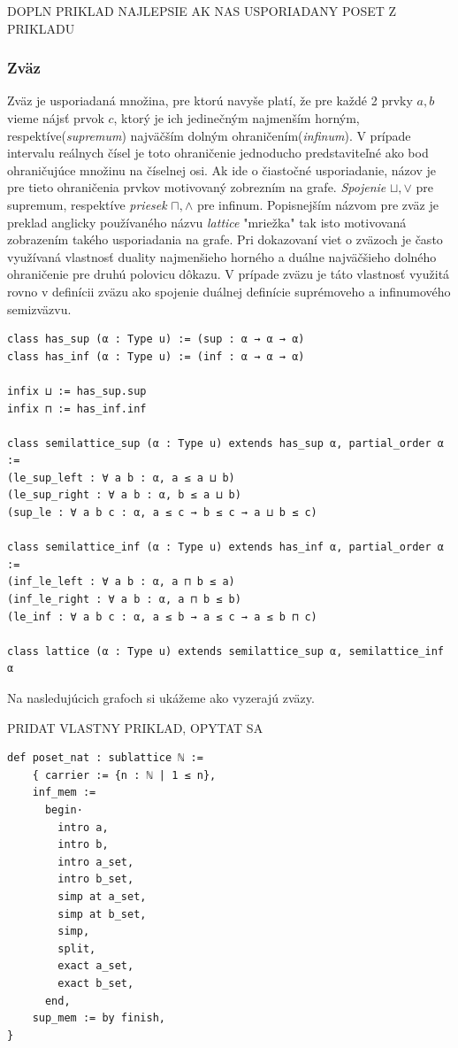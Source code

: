 \documentclass[a4paper,10pt,oneside]{report}%
\begin{document}
DOPLN PRIKLAD NAJLEPSIE AK NAS USPORIADANY POSET Z PRIKLADU

\subsubsection{Zväz}
    Zväz je usporiadaná množina, pre ktorú navyše platí, že pre každé 2 prvky $a, b$
vieme nájsť prvok $c$, ktorý je ich jedinečným najmenším horným, respektíve(\emph{supremum})
najväčším dolným ohraničením(\emph{infinum}).
    V prípade intervalu reálnych čísel je toto ohraničenie jednoducho predstaviteľné
ako bod ohraničujúce množinu na číselnej osi.
    Ak ide o čiastočné usporiadanie, názov je pre tieto ohraničenia prvkov
motivovaný zobrezním na grafe.
    \emph{Spojenie} $\sqcup, \vee$ pre supremum, respektíve \emph{priesek} $\sqcap, \wedge$ pre infinum.
    Popisnejším názvom pre zväz je preklad anglicky používaného názvu \emph{lattice}
"mriežka" tak isto motivovaná zobrazením takého usporiadania na grafe.
    Pri dokazovaní viet o zväzoch je často využívaná vlastnosť duality najmenšieho
horného a duálne najväčšieho dolného ohraničenie pre druhú polovicu dôkazu.
    V prípade zväzu je táto vlastnosť využitá rovno v definícii zväzu ako spojenie
duálnej definície suprémoveho a infinumového semizväzvu.

\begin{lstlisting}
class has_sup (α : Type u) := (sup : α → α → α)
class has_inf (α : Type u) := (inf : α → α → α)

infix ⊔ := has_sup.sup
infix ⊓ := has_inf.inf

class semilattice_sup (α : Type u) extends has_sup α, partial_order α :=
(le_sup_left : ∀ a b : α, a ≤ a ⊔ b)
(le_sup_right : ∀ a b : α, b ≤ a ⊔ b)
(sup_le : ∀ a b c : α, a ≤ c → b ≤ c → a ⊔ b ≤ c)

class semilattice_inf (α : Type u) extends has_inf α, partial_order α :=
(inf_le_left : ∀ a b : α, a ⊓ b ≤ a)
(inf_le_right : ∀ a b : α, a ⊓ b ≤ b)
(le_inf : ∀ a b c : α, a ≤ b → a ≤ c → a ≤ b ⊓ c)

class lattice (α : Type u) extends semilattice_sup α, semilattice_inf α
\end{lstlisting}

Na nasledujúcich grafoch si ukážeme ako vyzerajú zväzy.

PRIDAT VLASTNY PRIKLAD, OPYTAT SA
\begin{lstlisting}
def poset_nat : sublattice ℕ :=
    { carrier := {n : ℕ | 1 ≤ n},
    inf_mem :=
      begin·
        intro a,
        intro b,
        intro a_set,
        intro b_set,
        simp at a_set,
        simp at b_set,
        simp,
        split,
        exact a_set,
        exact b_set,
      end,
    sup_mem := by finish,
}
\end{lstlisting}
\end{document}
